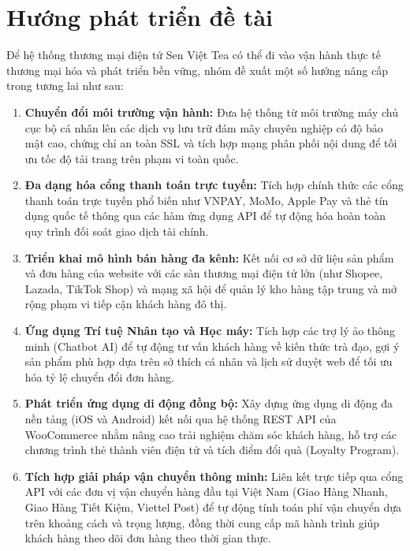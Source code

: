 \section*{Hướng phát triển đề tài}

Để hệ thống thương mại điện tử Sen Việt Tea có thể đi vào vận hành thực tế thương mại hóa và phát triển bền vững, nhóm đề xuất một số hướng nâng cấp trong tương lai như sau:
\begin{enumerate}
    \item \textbf{Chuyển đổi môi trường vận hành:} Đưa hệ thống từ môi trường máy chủ cục bộ cá nhân lên các dịch vụ lưu trữ đám mây chuyên nghiệp có độ bảo mật cao, chứng chỉ an toàn SSL và tích hợp mạng phân phối nội dung để tối ưu tốc độ tải trang trên phạm vi toàn quốc.
    
    \item \textbf{Đa dạng hóa cổng thanh toán trực tuyến:} Tích hợp chính thức các cổng thanh toán trực tuyến phổ biến như VNPAY, MoMo, Apple Pay và thẻ tín dụng quốc tế thông qua các hàm ứng dụng API để tự động hóa hoàn toàn quy trình đối soát giao dịch tài chính.
    
    \item \textbf{Triển khai mô hình bán hàng đa kênh:} Kết nối cơ sở dữ liệu sản phẩm và đơn hàng của website với các sàn thương mại điện tử lớn (như Shopee, Lazada, TikTok Shop) và mạng xã hội để quản lý kho hàng tập trung và mở rộng phạm vi tiếp cận khách hàng đô thị.
    
    \item \textbf{Ứng dụng Trí tuệ Nhân tạo và Học máy:} Tích hợp các trợ lý ảo thông minh (Chatbot AI) để tự động tư vấn khách hàng về kiến thức trà đạo, gợi ý sản phẩm phù hợp dựa trên sở thích cá nhân và lịch sử duyệt web để tối ưu hóa tỷ lệ chuyển đổi đơn hàng.
    
    \item \textbf{Phát triển ứng dụng di động đồng bộ:} Xây dựng ứng dụng di động đa nền tảng (iOS và Android) kết nối qua hệ thống REST API của WooCommerce nhằm nâng cao trải nghiệm chăm sóc khách hàng, hỗ trợ các chương trình thẻ thành viên điện tử và tích điểm đổi quà (Loyalty Program).
    
    \item \textbf{Tích hợp giải pháp vận chuyển thông minh:} Liên kết trực tiếp qua cổng API với các đơn vị vận chuyển hàng đầu tại Việt Nam (Giao Hàng Nhanh, Giao Hàng Tiết Kiệm, Viettel Post) để tự động tính toán phí vận chuyển dựa trên khoảng cách và trọng lượng, đồng thời cung cấp mã hành trình giúp khách hàng theo dõi đơn hàng theo thời gian thực.
\end{enumerate}


